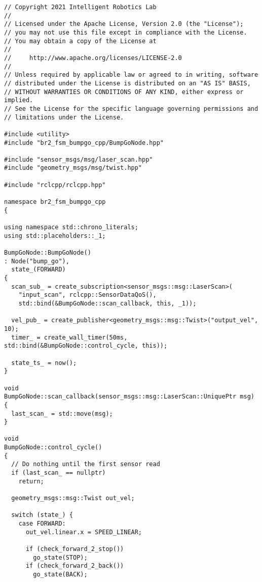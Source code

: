  \footnotesize
\begin{tcolorbox}[sharp corners, colframe=gray!80, colback=LightGray, left=0pt, top=0pt, bottom=0pt, title=\texttt{br2\_fsm\_bumpgo\_cpp/src/br2\_fsm\_bumpgo\_cpp/BumpGoNode.cpp}]
  \begin{verbatim}
// Copyright 2021 Intelligent Robotics Lab
//
// Licensed under the Apache License, Version 2.0 (the "License");
// you may not use this file except in compliance with the License.
// You may obtain a copy of the License at
//
//     http://www.apache.org/licenses/LICENSE-2.0
//
// Unless required by applicable law or agreed to in writing, software
// distributed under the License is distributed on an "AS IS" BASIS,
// WITHOUT WARRANTIES OR CONDITIONS OF ANY KIND, either express or implied.
// See the License for the specific language governing permissions and
// limitations under the License.

#include <utility> 
#include "br2_fsm_bumpgo_cpp/BumpGoNode.hpp" 

#include "sensor_msgs/msg/laser_scan.hpp" 
#include "geometry_msgs/msg/twist.hpp" 

#include "rclcpp/rclcpp.hpp" 

namespace br2_fsm_bumpgo_cpp 
{ 

using namespace std::chrono_literals; 
using std::placeholders::_1; 

BumpGoNode::BumpGoNode() 
: Node("bump_go"), 
  state_(FORWARD) 
{
  scan_sub_ = create_subscription<sensor_msgs::msg::LaserScan>( 
    "input_scan", rclcpp::SensorDataQoS(), 
    std::bind(&BumpGoNode::scan_callback, this, _1)); 

  vel_pub_ = create_publisher<geometry_msgs::msg::Twist>("output_vel", 10); 
  timer_ = create_wall_timer(50ms, std::bind(&BumpGoNode::control_cycle, this)); 

  state_ts_ = now(); 
} 

void 
BumpGoNode::scan_callback(sensor_msgs::msg::LaserScan::UniquePtr msg) 
{ 
  last_scan_ = std::move(msg); 
}

void
BumpGoNode::control_cycle() 
{ 
  // Do nothing until the first sensor read 
  if (last_scan_ == nullptr)
    return; 

  geometry_msgs::msg::Twist out_vel; 

  switch (state_) { 
    case FORWARD: 
      out_vel.linear.x = SPEED_LINEAR; 

      if (check_forward_2_stop())
        go_state(STOP); 
      if (check_forward_2_back())
        go_state(BACK);


\end{verbatim}
\end{tcolorbox}
